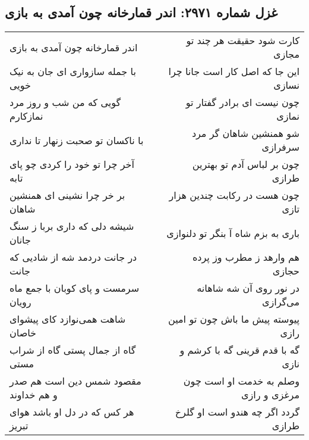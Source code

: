 \begin{center}
\section*{غزل شماره ۲۹۷۱: اندر قمارخانه چون آمدی به بازی}
\label{sec:2971}
\begin{longtable}{l p{0.5cm} r}
اندر قمارخانه چون آمدی به بازی
&&
کارت شود حقیقت هر چند تو مجازی
\\
با جمله سازواری ای جان به نیک خویی
&&
این جا که اصل کار است جانا چرا نسازی
\\
گویی که من شب و روز مرد نمازکارم
&&
چون نیست ای برادر گفتار تو نمازی
\\
با ناکسان تو صحبت زنهار تا نداری
&&
شو همنشین شاهان گر مرد سرفرازی
\\
آخر چرا تو خود را کردی چو پای تابه
&&
چون بر لباس آدم تو بهترین طرازی
\\
بر خر چرا نشینی ای همنشین شاهان
&&
چون هست در رکابت چندین هزار تازی
\\
شیشه دلی که داری بربا ز سنگ جانان
&&
باری به بزم شاه آ بنگر تو دلنوازی
\\
در جانت دردمد شه از شادیی که جانت
&&
هم وارهد ز مطرب وز پرده حجازی
\\
سرمست و پای کوبان با جمع ماه رویان
&&
در نور روی آن شه شاهانه می‌گرازی
\\
شاهت همی‌نوازد کای پیشوای خاصان
&&
پیوسته پیش ما باش چون تو امین رازی
\\
گاه از جمال پستی گاه از شراب مستی
&&
گه با قدم قرینی گه با کرشم و نازی
\\
مقصود شمس دین است هم صدر و هم خداوند
&&
وصلم به خدمت او است چون مرغزی و رازی
\\
هر کس که در دل او باشد هوای تبریز
&&
گردد اگر چه هندو است او گلرخ طرازی
\\
\end{longtable}
\end{center}
